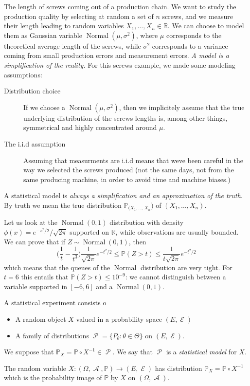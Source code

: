 \documentclass[
	fontsize=11pt, %
	twoside=false, %
	numbers=noenddot, %
]{kaobook}
\DeclareMathOperator{\cA}{\mathcal A}
\DeclareMathOperator{\cE}{\mathcal E}
\DeclareMathOperator{\cP}{\mathcal P}
\DeclareMathOperator{\nor}{Normal}
\renewcommand{\P}{\mathbb P}
\newcommand{\R}{\mathbb R}
\begin{document}
The length of screws coming out of a production chain.
We want to study the production quality by selecting at random a set of $n$ screws, and we measure their length leading to random variables $X_1, \ldots, X_n \in \R$.
We can choose to model them as Gaussian variable $\nor(\mu, \sigma^2)$, where $\mu$ corresponds to the theoretical average length of the screws, while $\sigma^2$ corresponds to a variance coming from small production errors and measurement errors.
\emph{A model is a simplification of the reality.} For this screws example, we made some modeling assumptions:

\begin{description}
	\item[Distribution choice] If we choose a $\nor(\mu, \sigma^2)$, then we implicitely assume that the true underlying distribution of the screws lengths is, among other things, symmetrical and highly concentrated around $\mu$.
	\item[The i.i.d assumption] Assuming that measurments are i.i.d means that weve been careful in the way we selected the screws produced (not the same days, not from the same producing machine, in order to avoid time and machine biases.)
\end{description}

A statistical model is \emph{always a simplification and an approximation of the truth}.
By truth we mean the true distribution $\P_{(X_1, \ldots, X_n})$ of $(X_1, \ldots, X_n)$.

Let us look at the $\nor(0, 1)$ distribution with density $\phi(x) = e^{-x^2/2} / \sqrt{2 \pi}$ supported on $\R$, while observations are usually bounded.
We can prove that if $Z \sim \nor(0, 1)$, then
\begin{equation*}
	\Big( \frac 1t - \frac{1}{t^3} \Big) \frac{1}{\sqrt{2\pi}} e^{-t^2 / 2} \leq \P(Z > t) \leq \frac{1}{t \sqrt{2 \pi}} e^{-t^2 / 2}
\end{equation*}
which means that the queues of the $\nor$ distribution are very tight.
For $t=6$ this entails that $\P(Z > t) \leq 10^{-9}$: we cannot distinguish between a variable supported in $[-6, 6]$ and a $\nor(0, 1)$.

\begin{definition}
	A statistical experiment consists o
	\begin{itemize}
		\item A random object $X$ valued in a probability space $(E, \cE)$
		\item A family of distributions $\cP = \{ P_\theta : \theta \in \Theta\}$ on $(E, \cE)$.
	\end{itemize}
	We suppose that $\P_X = \P \circ X^{-1} \in \cP$. We say that $\cP$ is a \emph{statistical model} for $X$.
\end{definition}
The random variable $X : (\Omega, \cA, \P) \rightarrow (E, \cE)$ has distribution  $\P_X = \P \circ X^{-1}$ which is the probability image of $\P$ by $X$ on $(\Omega, \cA)$.
\end{document}
